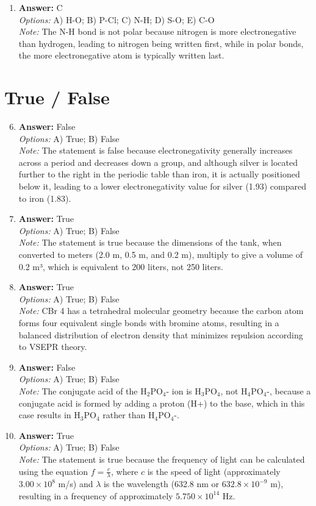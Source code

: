 \documentclass[12pt]{article}
\begin{document}
\begin{enumerate}[label=\arabic*.]
\item \textbf{Answer:} C
\\ \textit{Options:} A) H-O; B) P-Cl; C) N-H; D) S-O; E) C-O
\\ \textit{Note:} The N-H bond is not polar because nitrogen is more electronegative than hydrogen, leading to nitrogen being written first, while in polar bonds, the more electronegative atom is typically written last.
\end{enumerate}

\section*{True / False}
\begin{enumerate}[label=\arabic*.]
\setcounter{enumi}{5}
\item \textbf{Answer:} False
\\ \textit{Options:} A) True; B) False
\\ \textit{Note:} The statement is false because electronegativity generally increases across a period and decreases down a group, and although silver is located further to the right in the periodic table than iron, it is actually positioned below it, leading to a lower electronegativity value for silver (1.93) compared to iron (1.83).
\item \textbf{Answer:} True
\\ \textit{Options:} A) True; B) False
\\ \textit{Note:} The statement is true because the dimensions of the tank, when converted to meters (2.0 m, 0.5 m, and 0.2 m), multiply to give a volume of 0.2 m³, which is equivalent to 200 liters, not 250 liters.
\item \textbf{Answer:} True
\\ \textit{Options:} A) True; B) False
\\ \textit{Note:} CBr 4 has a tetrahedral molecular geometry because the carbon atom forms four equivalent single bonds with bromine atoms, resulting in a balanced distribution of electron density that minimizes repulsion according to VSEPR theory.
\item \textbf{Answer:} False
\\ \textit{Options:} A) True; B) False
\\ \textit{Note:} The conjugate acid of the H$_{2}$PO$_{4}$- ion is H$_{3}$PO$_{4}$, not H$_{4}$PO$_{4}$-, because a conjugate acid is formed by adding a proton (H+) to the base, which in this case results in H$_{3}$PO$_{4}$ rather than H$_{4}$PO$_{4}$-.
\item \textbf{Answer:} True
\\ \textit{Options:} A) True; B) False
\\ \textit{Note:} The statement is true because the frequency of light can be calculated using the equation \( f = \frac{c}{\lambda} \), where \( c \) is the speed of light (approximately \( 3.00 \times 10^8 \) m/s) and \( \lambda \) is the wavelength (632.8 nm or \( 632.8 \times 10^{-9} \) m), resulting in a frequency of approximately \( 5.750 \times 10^{14} \) Hz.
\end{enumerate}
\end{document}
